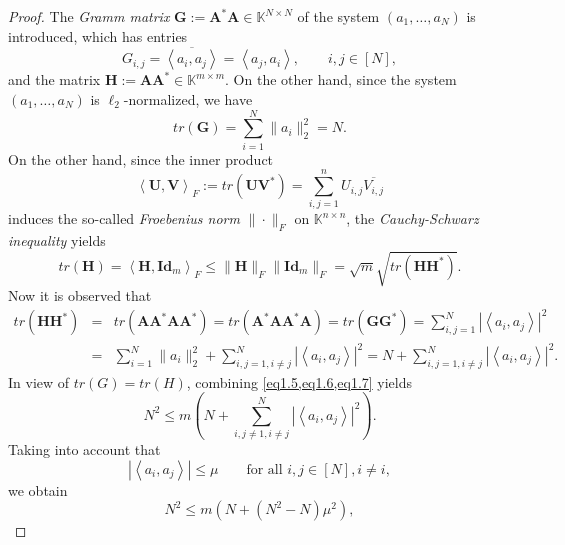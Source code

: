 \begin{proof}
    The \emph{\textcolor[rgb]{1,0,0}{Gramm matrix}} $\mathbf{G} := \mathbf{A}^*\mathbf{A} \in \mathbb{K}^{N \times N}$ of the system $(a_1,\dots,a_N)$ is introduced, which has entries
\begin{equation*}
    G_{i,j} = \overline{\left<a_i,a_j\right>} = \left<a_j,a_i\right>, \qquad i,j \in [N],
\end{equation*}
and the matrix $\mathbf{H} := \mathbf{AA}^* \in \mathbb{K}^{m \times m}$. On the other hand, since the system $(a_1,\dots,a_N)$ is $\ell_2$-normalized, we have 
\begin{equation}
    \label{eq1.5}
    tr(\mathbf{G}) = \sum\limits_{i = 1}^N \|a_i\|_2^2 = N.
\end{equation}
On the other hand, since the inner product
\begin{equation*}
    \left<\mathbf{U}, \mathbf{V}\right>_F := tr(\mathbf{UV}^*) = \sum\limits_{i,j=1}^n U_{i,j} \overline{V_{i,j}}
\end{equation*}
induces the so-called \emph{\textcolor[rgb]{1,0,0}{Froebenius norm}} $\|\cdot\|_F$ on $\mathbb{K}^{n \times n}$, the \emph{\textcolor[rgb]{1,0,0}{Cauchy-Schwarz inequality}} yields
\begin{equation}
    \label{eq1.6}
    tr(\mathbf{H}) = \left<\mathbf{H},\mathbf{Id}_m\right>_F \leq \|\mathbf{H}\|_F \|\mathbf{Id}_m\|_F = \sqrt{m} \sqrt{tr(\mathbf{HH}^*)}.
\end{equation}
Now it is observed that
\begin{eqnarray}
    tr(\mathbf{HH}^*) &=& tr(\mathbf{AA}^*\mathbf{AA}^*) = tr(\mathbf{A}^*\mathbf{AA}^*\mathbf{A}) =tr(\mathbf{GG}^*) = \sum\limits_{i,j = 1}^N \left|\left<a_i,a_j\right>\right|^2 \\
    &=& \sum\limits_{i=1}^N \|a_i\|_2^2 + \sum\limits_{i,j = 1, i \neq j}^N \left|\left<a_i,a_j\right>\right|^2 = N + \sum\limits_{i,j =1, i \neq j}^N \left|\left<a_i,a_j\right>\right|^2.
    \label{eq1.7}
\end{eqnarray}
In view of $tr(G) = tr(H)$, combining \cref{eq1.5,eq1.6,eq1.7} yields 
\begin{equation}
    N^2 \leq m \left( N+ \sum\limits_{i,j \neq 1, i\neq j}^N \left|\left<a_i,a_j\right>\right|^2 \right).
    \label{eq1.8}
\end{equation}
Taking into account that
\begin{equation}
    \left|\left<a_i,a_j\right>\right| \leq \mu \qquad \text{for all }i,j \in [N], i \neq i,
    \label{eq1.9}
\end{equation}
we obtain
\[
    N^2 \leq m(N+(N^2 - N)\mu^2),
\]
\end{proof}

